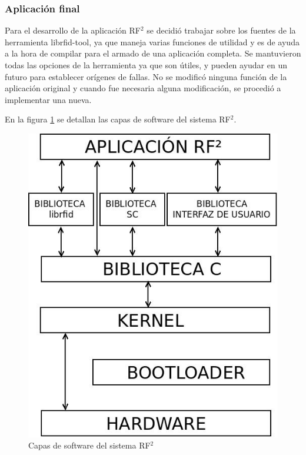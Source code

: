 \documentclass[%
        final,
        notitlepage,
        narroweqnarray,
        inline,
        ]{ieee}
\begin{document}
\subsubsection{Aplicación final}

Para el desarrollo de la aplicación RF$^{2}$ se decidió trabajar sobre los fuentes de la herramienta librfid-tool, ya que maneja varias funciones de utilidad y es de ayuda a la hora de compilar para el armado de una aplicación completa. Se mantuvieron todas las opciones de la herramienta ya que son útiles, y pueden ayudar en un futuro para establecer orígenes de fallas. No se modificó ninguna función de la aplicación original y cuando fue necesaria alguna modificación, se procedió a implementar una nueva.

En la figura \ref{Fig:SW} se detallan las capas de software del sistema RF$^{2}$.

\begin{figure}[h]
\centering
  \begin{center}
  \includegraphics[scale=.35]{../docs/Imagenes/SW.jpg} 
  \end{center}
  \caption{Capas de software del sistema RF${^{2}}$}\label{Fig:SW} 
\end{figure}
\end{document}
